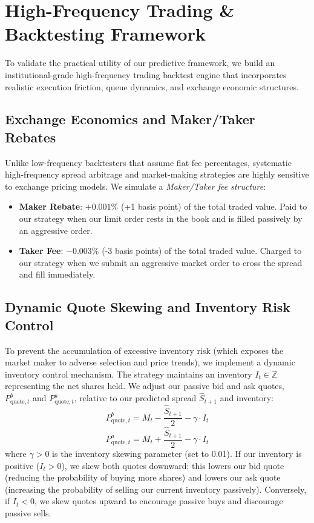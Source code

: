 \documentclass[11pt,a4paper]{article}
\begin{document}
\section{High-Frequency Trading & Backtesting Framework}
To validate the practical utility of our predictive framework, we build an institutional-grade high-frequency trading backtest engine that incorporates realistic execution friction, queue dynamics, and exchange economic structures.

\subsection{Exchange Economics and Maker/Taker Rebates}
Unlike low-frequency backtesters that assume flat fee percentages, systematic high-frequency spread arbitrage and market-making strategies are highly sensitive to exchange pricing models. We simulate a \textit{Maker/Taker fee structure}:
\begin{itemize}
    \item \textbf{Maker Rebate}: $+0.001\%$ (+1 basis point) of the total traded value. Paid to our strategy when our limit order rests in the book and is filled passively by an aggressive order.
    \item \textbf{Taker Fee}: $-0.003\%$ (-3 basis points) of the total traded value. Charged to our strategy when we submit an aggressive market order to cross the spread and fill immediately.
\end{itemize}

\subsection{Dynamic Quote Skewing and Inventory Risk Control}
To prevent the accumulation of excessive inventory risk (which exposes the market maker to adverse selection and price trends), we implement a dynamic inventory control mechanism. The strategy maintains an inventory $I_t \in \mathbb{Z}$ representing the net shares held. We adjust our passive bid and ask quotes, $P_{\text{quote}, t}^b$ and $P_{\text{quote}, t}^a$, relative to our predicted spread $\hat{S}_{t+1}$ and inventory:
\begin{equation}
    P_{\text{quote}, t}^b = M_t - \frac{\hat{S}_{t+1}}{2} - \gamma \cdot I_t
\end{equation}
\begin{equation}
    P_{\text{quote}, t}^a = M_t + \frac{\hat{S}_{t+1}}{2} - \gamma \cdot I_t
\end{equation}
where $\gamma > 0$ is the inventory skewing parameter (set to 0.01). If our inventory is positive ($I_t > 0$), we skew both quotes downward: this lowers our bid quote (reducing the probability of buying more shares) and lowers our ask quote (increasing the probability of selling our current inventory passively). Conversely, if $I_t < 0$, we skew quotes upward to encourage passive buys and discourage passive sells.
\end{document}

